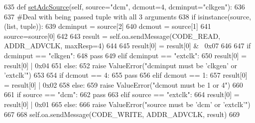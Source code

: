 \begin{DoxyCode}
635     \textcolor{keyword}{def }\hyperlink{classsoftware_1_1chipwhisperer_1_1capture_1_1scopes_1_1__OpenADCInterface_1_1ClockSettings_a36a63656e5b6eb27d31a7bfe99acd7c9}{setAdcSource}(self, source="dcm", dcmout=4, dcminput="clkgen"):
636 
637         \textcolor{comment}{#Deal with being passed tuple with all 3 arguments}
638         \textcolor{keywordflow}{if} isinstance(source, (list, tuple)):
639             dcminput = source[2]
640             dcmout = source[1]
641             source=source[0]
642 
643         result = self.oa.sendMessage(CODE\_READ, ADDR\_ADVCLK, maxResp=4)
644 
645         result[0] = result[0] & ~0x07
646 
647         \textcolor{keywordflow}{if} dcminput == \textcolor{stringliteral}{"clkgen"}:
648             \textcolor{keywordflow}{pass}
649         \textcolor{keywordflow}{elif} dcminput == \textcolor{stringliteral}{"extclk"}:
650             result[0] = result[0] | 0x04
651         \textcolor{keywordflow}{else}:
652             \textcolor{keywordflow}{raise} ValueError(\textcolor{stringliteral}{"dcminput must be 'clkgen' or 'extclk'"})
653 
654         \textcolor{keywordflow}{if} dcmout == 4:
655             \textcolor{keywordflow}{pass}
656         \textcolor{keywordflow}{elif} dcmout == 1:
657             result[0] = result[0] | 0x02
658         \textcolor{keywordflow}{else}:
659             \textcolor{keywordflow}{raise} ValueError(\textcolor{stringliteral}{"dcmout must be 1 or 4"})
660 
661         \textcolor{keywordflow}{if} source == \textcolor{stringliteral}{"dcm"}:
662             \textcolor{keywordflow}{pass}
663         \textcolor{keywordflow}{elif} source == \textcolor{stringliteral}{"extclk"}:
664             result[0] = result[0] | 0x01
665         \textcolor{keywordflow}{else}:
666             \textcolor{keywordflow}{raise} ValueError(\textcolor{stringliteral}{"source must be 'dcm' or 'extclk'"})
667 
668         self.oa.sendMessage(CODE\_WRITE, ADDR\_ADVCLK, result)
669 
\end{DoxyCode}
\hypertarget{classsoftware_1_1chipwhisperer_1_1capture_1_1scopes_1_1__OpenADCInterface_1_1ClockSettings_af0a2a436be03b94592bfcdfe62af41d9}{}
